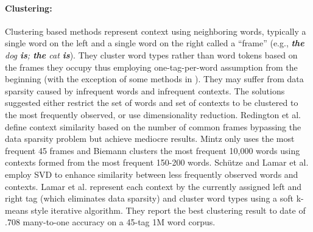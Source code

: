 \paragraph{Clustering:}
Clustering based methods represent context using neighboring words,
typically a single word on the left and a single word on the right
called a ``frame'' (e.g., {\em {\bf the} dog {\bf is}; {\bf the} cat
  {\bf is}}).  They cluster word types rather than word tokens based
on the frames they occupy thus employing one-tag-per-word assumption
from the beginning (with the exception of some methods in
\cite{Schutze:1995:DPT:976973.976994}).  They may suffer from data
sparsity caused by infrequent words and infrequent contexts.  The
solutions suggested either restrict the set of words and set of
contexts to be clustered to the most frequently observed, or use
dimensionality reduction.  Redington et
al.  define context similarity
based on the number of common frames bypassing the data sparsity
problem but achieve mediocre results.  Mintz
 only uses the most frequent 45 frames
and Biemann  clusters the most
frequent 10,000 words using contexts formed from the most frequent
150-200 words.  Sch\"utze 
and Lamar et al.  employ SVD to enhance
similarity between less frequently observed words and contexts.  Lamar
et al.  represent each
context by the currently assigned left and right tag (which eliminates
data sparsity) and cluster word types using a soft k-means style
iterative algorithm.  They report the best clustering result to date
of .708 many-to-one accuracy on a 45-tag 1M word corpus.

